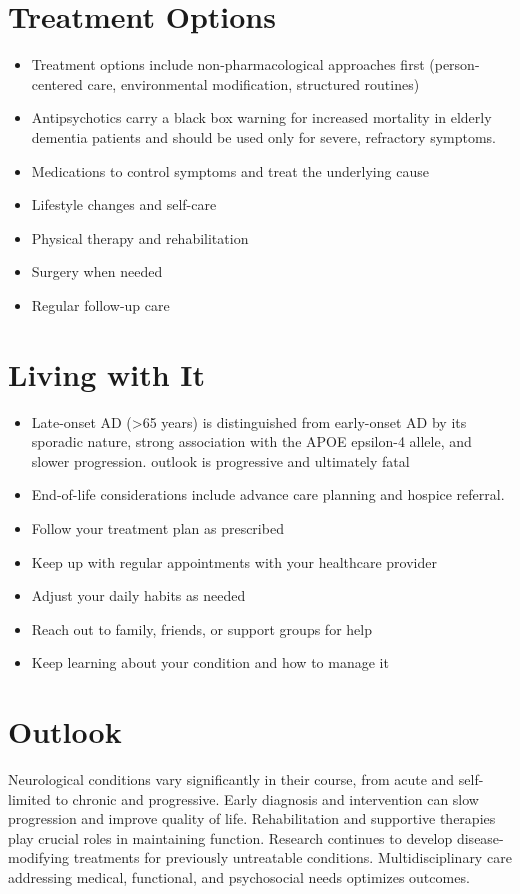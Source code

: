 \section{Treatment Options}

\begin{itemize}[noitemsep]
  \item Treatment options include non-pharmacological approaches first (person-centered care, environmental modification, structured routines)
  \item Antipsychotics carry a black box warning for increased mortality in elderly dementia patients and should be used only for severe, refractory symptoms.
  \item Medications to control symptoms and treat the underlying cause
  \item Lifestyle changes and self-care
  \item Physical therapy and rehabilitation
  \item Surgery when needed
  \item Regular follow-up care
\end{itemize}

\section{Living with It}

\begin{itemize}[noitemsep]
  \item Late-onset AD (>65 years) is distinguished from early-onset AD by its sporadic nature, strong association with the APOE epsilon-4 allele, and slower progression. outlook is progressive and ultimately fatal
  \item End-of-life considerations include advance care planning and hospice referral.
  \item Follow your treatment plan as prescribed
  \item Keep up with regular appointments with your healthcare provider
  \item Adjust your daily habits as needed
  \item Reach out to family, friends, or support groups for help
  \item Keep learning about your condition and how to manage it
\end{itemize}

\section{Outlook}
Neurological conditions vary significantly in their course, from acute and self-limited to chronic and progressive. Early diagnosis and intervention can slow progression and improve quality of life. Rehabilitation and supportive therapies play crucial roles in maintaining function. Research continues to develop disease-modifying treatments for previously untreatable conditions. Multidisciplinary care addressing medical, functional, and psychosocial needs optimizes outcomes.
